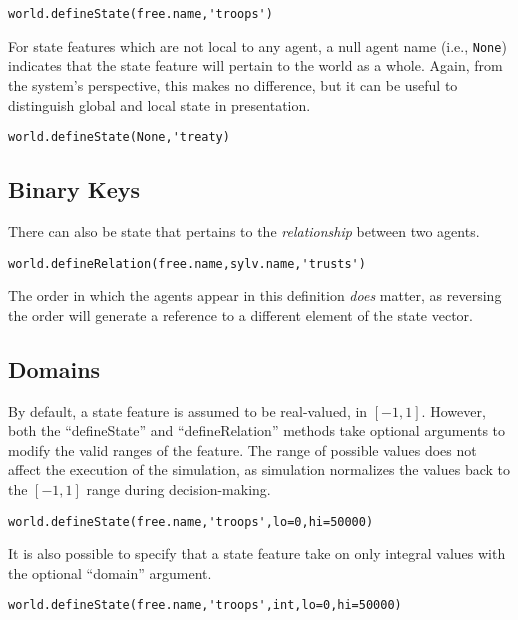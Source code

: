 \documentclass{book}
\begin{document}
\begin{verbatim}
world.defineState(free.name,'troops')
\end{verbatim}

For state features which are not local to any agent, a null agent name (i.e., {\tt None}) indicates that the state feature will pertain to the world as a whole. Again, from the system's perspective, this makes no difference, but it can be useful to distinguish global and local state in presentation.

\begin{verbatim}
world.defineState(None,'treaty)
\end{verbatim}

\subsection{Binary Keys}
There can also be state that pertains to the {\em relationship} between two agents. 

\begin{verbatim}
world.defineRelation(free.name,sylv.name,'trusts')
\end{verbatim}

The order in which the agents appear in this definition {\em does} matter, as reversing the order will generate a reference to a different element of the state vector.

\subsection{Domains}
By default, a state feature is assumed to be real-valued, in $[-1,1]$. However, both the ``defineState'' and ``defineRelation'' methods take optional arguments to modify the valid ranges of the feature. The range of possible values does not affect the execution of the simulation, as simulation normalizes the values back to the $[-1,1]$ range during decision-making.

\begin{verbatim}
world.defineState(free.name,'troops',lo=0,hi=50000)
\end{verbatim}

It is also possible to specify that a state feature take on only integral values with the optional ``domain'' argument.

\begin{verbatim}
world.defineState(free.name,'troops',int,lo=0,hi=50000)
\end{verbatim}
\end{document}
